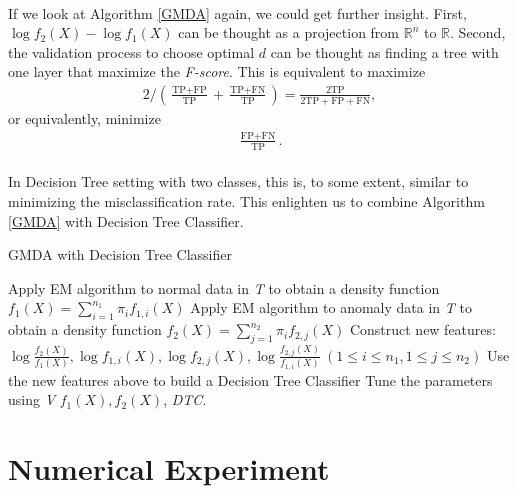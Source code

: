 \documentclass[english]{article}
\newenvironment{eqt}{\begin{equation}\begin{aligned}}{\end{aligned}\end{equation}}
\begin{document}
\paragraph{}

If we look at Algorithm \ref{GMDA} again, we could get further insight. First, $\log f_2(X) - \log f_1(X)$ can be thought as a projection from $\mathbb{R}^n$ to $\mathbb{R}$. Second, the validation process to choose optimal $d$ can be thought as finding a tree with one layer that maximize the \textit{F-score}. This is equivalent to maximize 
\begin{eqt}
2\bigg/\left(\frac{\text{TP}+\text{FP}}{\text{TP}}+\frac{\text{TP}+\text{FN}}{\text{TP}}\right) = \frac{2\text{TP}}{2\text{TP}+\text{FP}+\text{FN}},
\end{eqt}
or equivalently, minimize
\begin{eqt}
\frac{\text{FP} + \text{FN}}{\text{TP}}.
\end{eqt}
\paragraph{}
In Decision Tree setting with two classes, this is, to some extent, similar to minimizing the misclassification rate. This enlighten us to combine Algorithm \ref{GMDA} with Decision Tree Classifier.

\begin{algorithm}[H]
\label{GMDA-DTC}
\caption{GMDA with Decision Tree Classifier}
\SetAlgoLined
		Apply EM algorithm to normal data in \textit{T} to obtain a density function $f_1(X) = \sum_{i=1}^{n_1}\pi_if_{1, i}(X)$\;
		Apply EM algorithm to anomaly data in \textit{T} to obtain a density function $f_2(X) = \sum_{j=1}^{n_2}\pi_if_{2, j}(X)$\;
		Construct new features:\ $\log \frac{f_2(X)}{f_1(X)}, \log f_{1, i}(X), \log f_{2, j}(X), \log \frac{f_{2, j}(X)}{f_{1, i}(X)}\ (1\leqslant i\leqslant n_1, 1\leqslant j\leqslant n_2)$\;
		Use the new features above to build a Decision Tree Classifier\;
		Tune the parameters using \textit{V}\;
		\Return $f_1(X), f_2(X)$, \textit{DTC}.
\end{algorithm}


\section{Numerical Experiment}
\end{document}
